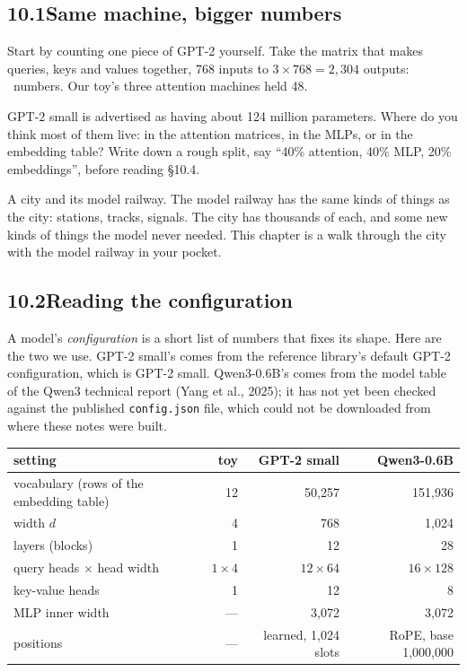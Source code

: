 \subsection*{10.1\quad Same machine, bigger numbers}

Start by counting one piece of GPT-2 yourself. Take the matrix that makes queries, keys and values together,
768 inputs to $3\times768 = 2{,}304$ outputs: \nTenGptAttnWeight\ numbers. Our toy's three attention machines
held 48.

\Predict GPT-2 small is advertised as having about 124 million parameters. Where do you think most of them
live: in the attention matrices, in the MLPs, or in the embedding table? Write down a rough split, say
``40\% attention, 40\% MLP, 20\% embeddings'', before reading \S10.4.

\Picture A city and its model railway. The model railway has the same kinds of things as the city: stations,
tracks, signals. The city has thousands of each, and some new kinds of things the model never needed. This
chapter is a walk through the city with the model railway in your pocket.


\subsection*{10.2\quad Reading the configuration}

A model's \emph{configuration} is a short list of numbers that fixes its shape. Here are the two we use.
GPT-2 small's comes from the reference library's default GPT-2 configuration, which is GPT-2 small. Qwen3-0.6B's
comes from the model table of the Qwen3 technical report (Yang et al., 2025); it has not yet been checked
against the published \texttt{config.json} file, which could not be downloaded from where these notes were built.

\begin{center}
\small
\begin{tabular}{@{}l r r r@{}}
\toprule
setting & toy & GPT-2 small & Qwen3-0.6B\\
\midrule
vocabulary (rows of the embedding table) & 12 & 50{,}257 & 151{,}936\\
width $d$ & 4 & 768 & 1{,}024\\
layers (blocks) & 1 & 12 & 28\\
query heads $\times$ head width & $1\times4$ & $12\times64$ & $16\times128$\\
key-value heads & 1 & 12 & 8\\
MLP inner width & --- & 3{,}072 & 3{,}072\\
positions & --- & learned, 1{,}024 slots & RoPE, base 1{,}000{,}000\\
\bottomrule
\end{tabular}
\end{center}


